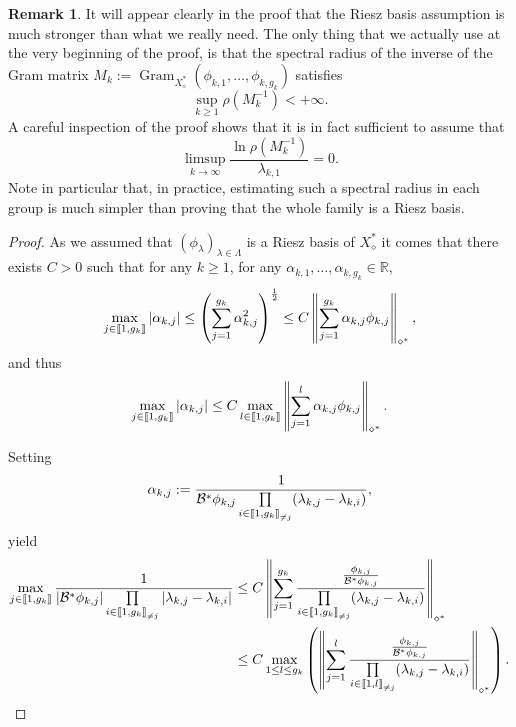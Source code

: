 \documentclass[10pt]{amsart}
\theoremstyle{definition}\newtheorem{defi}[theo]{Definition}\newtheorem{rema}[theo]{Remark}\newtheorem{exam}[theo]{Example}\newtheorem{exem}[theo]{Example}\newtheorem{nota}[theo]{Notation}
\newcommand{\llbracket}{\mathopen{[\mkern -2.7mu[}}
\newcommand{\rrbracket}{\mathclose{]\mkern -2.7mu]}}
\newcommand{\inter}[2]{\llbracket #1,#2 \rrbracket}
\newcommand{\interexclu}[3]{\llbracket #1,#2\rrbracket_{\neq #3}}
\newcommand\Bs{\mathcal{B}^*}
\newcommand{\Xalphas}{X_\diamond^*}
\newcommand{\normeXalphas}[1]{\left\| #1 \right\|_{\diamond^*}}
\newcommand{\n}{g}
\newcommand{\R}{\mathbb{R}}
\DeclareMathOperator{\Gram}{Gram}
\begin{document}
\begin{rema}
It will appear clearly in the proof that the Riesz basis assumption is much stronger than what we really need. The only thing that we actually use at the very beginning of the proof, is that the spectral radius of the inverse of the Gram matrix $M_k:={\Gram}_{\Xalphas}(\phi_{k,1},\dotsc,\phi_{k,\n_k})$ satisfies
\[
\sup_{k\geq 1} \rho(M_k^{-1}) < +\infty.
\]
A careful inspection of the proof shows that it is in fact sufficient to assume that
\[
\limsup_{k\to \infty} \frac{\ln \rho(M_k^{-1})}{\lambda_{k,1}} = 0.
\]
Note in particular that, in practice, estimating such a spectral radius in each group is much simpler than proving that the whole family is a Riesz basis.
\end{rema}

\begin{proof}
As we assumed that $(\phi_\lambda)_{\lambda \in \Lambda}$ is a Riesz basis of $\Xalphas$ it comes that there exists $C>0$ such that for any $k \geq 1$, for any $\alpha_{k,1}, \dots, \alpha_{k,\n_k} \in \R$,
\[
\max_{j\in \inter{1}{\n_k}} |\alpha_{k,j}| \leq \left(\sum_{j=1}^{\n_k} \alpha_{k,j}^2 \right)^{\frac{1}{2}}
\leq C \normeXalphas{ \sum_{j=1}^{\n_k} \alpha_{k,j} \phi_{k,j} },
\]
and thus
\[
\max_{j\in \inter{1}{\n_k}} |\alpha_{k,j}| \leq C \max\limits_{l\in \inter{1}{\n_k}} \normeXalphas{ \sum_{j=1}^{l} \alpha_{k,j} \phi_{k,j} }.
\]

\pagebreak
Setting
\[
\alpha_{k,j} := \frac{1}{ \Bs \phi_{k,j} \prod\limits_{i\in \interexclu{1}{\n_k}{j}} (\lambda_{k,j}-\lambda_{k,i})},
\]
yield
\begin{align*}
\max\limits_{j\in \inter{1}{\n_k}} \frac{1}{ | \Bs\phi_{k,j} | \prod\limits_{i\in\interexclu{1}{\n_k}{j}}|\lambda_{k,j}-\lambda_{k,i} | } &\leq C \normeXalphas{\sum\limits_{j=1}^{\n_k} \frac{ \frac{\phi_{k,j}}{\Bs \phi_{k,j}}}{\prod\limits_{i\in \interexclu{1}{\n_k}{j}} (\lambda_{k,j}-\lambda_{k,i})}}
\\
&\leq C \max\limits_{1 \leq l \leq \n_k} \left(\normeXalphas{\sum\limits_{j=1}^{l} \frac{ \frac{\phi_{k,j}}{\Bs \phi_{k,j}}}{\prod\limits_{i\in \interexclu{1}{l}{j}} (\lambda_{k,j}-\lambda_{k,i})}} \right).
\end{align*}




\end{proof}
\end{document}
